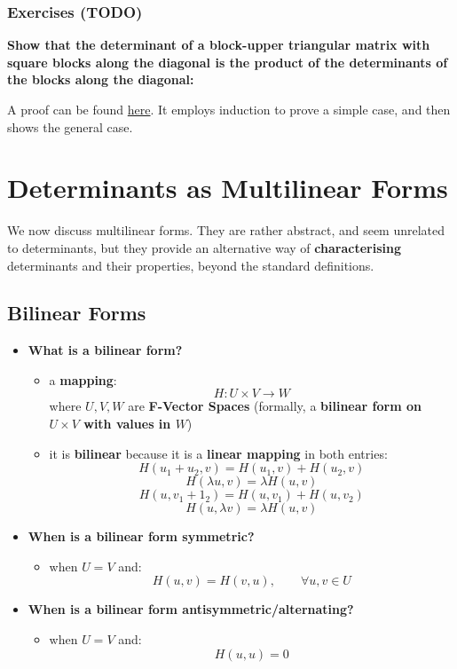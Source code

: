 \documentclass{exam}
\begin{document}
\subsubsection{Exercises (TODO)}

\begin{questions}

\question \textbf{Show that the determinant of a block-upper triangular matrix with square blocks along the diagonal is the product of the determinants of the blocks along the diagonal:}

A proof can be found \href{https://proofwiki.org/wiki/Determinant_of_Block_Diagonal_Matrix}{here}. It employs induction to prove a simple case, and then shows the general case.

\end{questions}

\section{Determinants as Multilinear Forms}

We now discuss multilinear forms. They are rather abstract, and seem unrelated to determinants, but they provide an alternative way of \textbf{characterising} determinants and their properties, beyond the standard definitions.

\subsection{Bilinear Forms}

\begin{itemize}
    \item \textbf{What is a bilinear form?}
    \begin{itemize}
        \item a \textbf{mapping}:
        \[
        H : U \times V \to W
        \]
        where $U,V,W$ are \textbf{F-Vector Spaces} (formally, a \textbf{bilinear form on $U \times V$ with values in $W$})
        \item it is \textbf{bilinear} because it is a \textbf{linear mapping} in both entries:
        \[
        H(u_1 + u_2, v) = H(u_1,v) + H(u_2,v)
        \]
        \[
        H(\lambda u, v) = \lambda H(u,v)
        \]
        \[
        H(u, v_1 + 1_2) = H(u,v_1) + H(u,v_2)
        \]
        \[
        H(u, \lambda v) = \lambda H(u,v)
        \]
    \end{itemize}
    \item \textbf{When is a bilinear form symmetric?}
    \begin{itemize}
        \item when $U = V$ and:
        \[
        H(u,v) = H(v,u), \qquad \forall u,v \in U
        \]
    \end{itemize}
    \item \textbf{When is a bilinear form antisymmetric/alternating?}
    \begin{itemize}
        \item when $U = V$ and:
        \[
        H(u,u) = 0
        \]
    \end{itemize}
\end{itemize}
\end{document}
